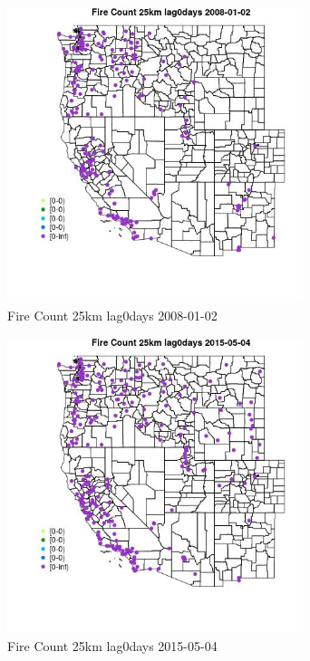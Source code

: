 \begin{figure} 
\centering  
\includegraphics[width=0.77\textwidth]{Code_Outputs/Report_ML_input_PM25_Step4_part_e_de_duplicated_aves_compiled_2019-05-18wNAs_MapObsFire_Count_25km_lag0days2008-01-02.jpg} 
\caption{\label{fig:Report_ML_input_PM25_Step4_part_e_de_duplicated_aves_compiled_2019-05-18wNAsMapObsFire_Count_25km_lag0days2008-01-02}Fire Count 25km lag0days 2008-01-02} 
\end{figure} 
 

\clearpage 

\begin{figure} 
\centering  
\includegraphics[width=0.77\textwidth]{Code_Outputs/Report_ML_input_PM25_Step4_part_e_de_duplicated_aves_compiled_2019-05-18wNAs_MapObsFire_Count_25km_lag0days2015-05-04.jpg} 
\caption{\label{fig:Report_ML_input_PM25_Step4_part_e_de_duplicated_aves_compiled_2019-05-18wNAsMapObsFire_Count_25km_lag0days2015-05-04}Fire Count 25km lag0days 2015-05-04} 
\end{figure} 
 

